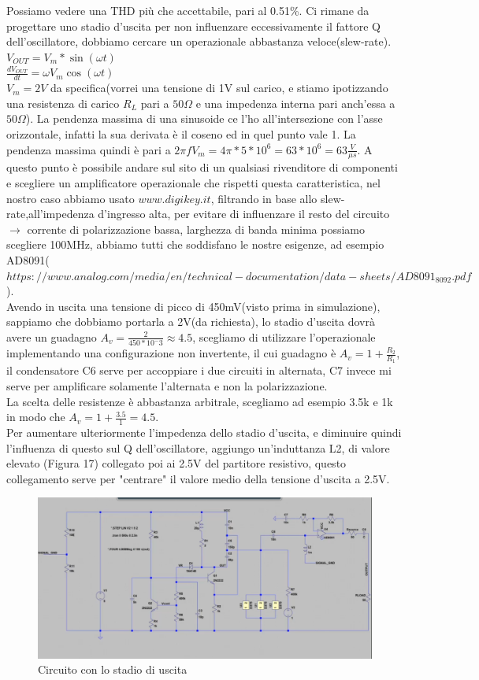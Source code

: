 \documentclass{article}
\begin{document}
Possiamo vedere una THD più che accettabile, pari al 0.51\%.
Ci rimane da progettare uno stadio d'uscita per non influenzare eccessivamente il fattore Q dell'oscillatore, dobbiamo cercare un operazionale abbastanza veloce(slew-rate).
$V_{OUT}=V_m * \sin(\omega t) $\\$\frac{dV_{OUT}}{dt}=\omega V_m \cos(\omega t)$\\$V_m=2V$ da specifica(vorrei una tensione di 1V sul carico, e stiamo ipotizzando una resistenza di carico $R_L$ pari a $50\Omega$ e una impedenza interna pari anch'essa a $50\Omega$).
La pendenza massima di una sinusoide ce l'ho all'intersezione con l'asse orizzontale, infatti la sua derivata è il coseno ed in quel punto vale 1.
La pendenza massima quindi è pari a $2 \pi f V_m=4\pi * 5 *10^6=63*10^6=63\frac{V}{\mu s}$.
A questo punto è possibile andare sul sito di un qualsiasi rivenditore di componenti e scegliere un amplificatore operazionale che rispetti questa caratteristica, nel nostro caso abbiamo usato $www.digikey.it$, filtrando in base allo slew-rate,all'impedenza d'ingresso alta, per evitare di influenzare il resto del circuito $\rightarrow$ corrente di polarizzazione bassa, larghezza di banda minima possiamo scegliere 100MHz, abbiamo tutti che soddisfano le nostre esigenze, ad esempio AD8091($https://www.analog.com/media/en/technical-documentation/data-sheets/AD8091_8092.pdf$).\\
Avendo in uscita una tensione di picco di 450mV(visto prima in simulazione), sappiamo che dobbiamo portarla a 2V(da richiesta), lo stadio d'uscita dovrà avere un guadagno $A_v=\frac{2}{450*10^-3}\approx 4.5$, scegliamo di utilizzare l'operazionale implementando una configurazione non invertente, il cui guadagno è $A_v=1+\frac{R_2}{R_1}$, il condensatore C6 serve per accoppiare i due circuiti in alternata, C7 invece mi serve per amplificare solamente l'alternata e non la polarizzazione.\\La scelta delle resistenze è abbastanza arbitrale, scegliamo ad esempio 3.5k e 1k in modo che $A_v=1+\frac{3.5}{1}=4.5$.\\Per aumentare ulteriormente l'impedenza dello stadio d'uscita, e diminuire quindi l'influenza di questo sul Q dell'oscillatore, aggiungo un'induttanza L2, di valore elevato (Figura 17) collegato poi ai 2.5V del partitore resistivo, questo collegamento serve per "centrare" il valore medio della tensione d'uscita a 2.5V.
~\begin{figure}[H]
\includegraphics[width=\textwidth]{CircuitoConBuffer}
\centering
\caption{Circuito con lo stadio di uscita}
\label{fig:foo}
\end{figure}
\end{document}
